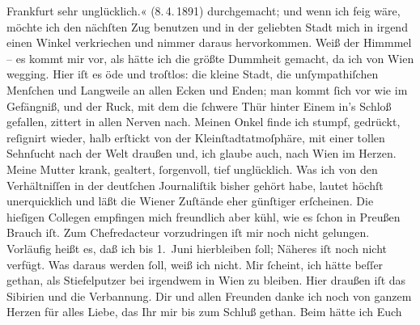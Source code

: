 \begin{ledgroupsized}[t]{13cm}
{{{                        Frankfurt sehr unglücklich.«
                     (8. 4. 1891)}}}\label{K_L02660-22h}
               durchgemacht; und wenn ich feig wäre, möchte ich den nächſten Zug benutzen und in der
               geliebten Stadt mich in irgend
               einen Winkel verkriechen und nimmer daraus hervorkommen. Weiß der Himmmel – es kommt
               mir vor, als hätte ich die größte Dummheit gemacht, da ich von Wien wegging. Hier iſt es öde und troſtlos: die kleine Stadt, die unſympathiſchen
               Menſchen und Langweile an allen Ecken und Enden; man kommt ſich vor wie im Gefängniß,
               und der Ruck, mit dem {\pb}die ſchwere Thür hinter Einem
               in’s Schloß gefallen, zittert in allen Nerven nach. Meinen Onkel finde ich stumpf, gedrückt, reſignirt
               wieder, halb erſtickt von der Kleinſtadtatmoſphäre, mit einer tollen Sehnſucht nach
               der Welt draußen und, ich glaube auch, nach Wien
               im Herzen. Meine Mutter
               krank, gealtert, ſorgenvoll, tief unglücklich. Was ich von den Verhältniſſen in der
               deutſchen Journaliſtik bisher gehört habe, lautet höchſt unerquicklich und läßt die
                  Wiener Zuſtände eher günſtiger erſcheinen. Die
               hieſigen Collegen empfingen mich freundlich aber kühl, wie es ſchon in Preußen Brauch iſt. Zum Chefredacteur vorzudringen iſt mir noch
               nicht gelungen. Vorläufig heißt es, daß ich bis 1. Juni hierbleiben ſoll; Näheres iſt noch nicht verfügt. Was daraus
               werden ſoll, weiß ich nicht. Mir ſcheint, ich hätte beſſer gethan, als {\pb}Stiefelputzer bei irgendwem in Wien zu bleiben. Hier draußen iſt das Sibirien und die Verbannung.\pend
           \pstart
           Dir und allen Freunden danke ich noch von ganzem Herzen für alles Liebe, das Ihr  mir bis zum Schluß gethan. Beim \label{K_L02660-2v}\label{K_L02660-2h} hätte ich Euch

\end{ledgroupsized}
